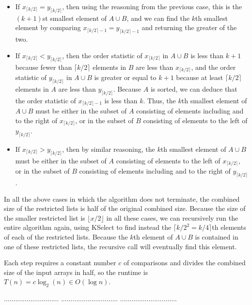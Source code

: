 \documentclass[a4paper,11pt]{article}
\begin{document}
\begin{itemize}
    \item
        If $x_{\lceil k/2 \rceil} = y_{\lceil k/2 \rceil}$, then using the reasoning from the previous case, this is the $(k + 1)$st smallest element of $A \cup B$, and we can find the $k$th smallest element by comparing $x_{\lceil k/2 \rceil - 1} = y_{\lceil k/2 \rceil - 1}$ and returning the greater of the two.
    \item
        If $x_{\lceil k/2 \rceil} < y_{\lceil k/2 \rceil}$, then the order statistic of $x_{\lceil k/2 \rceil}$ in $A \cup B$ is less than $k + 1$ because fewer than $\lceil k/2 \rceil$ elements in $B$ are less than $x_{\lceil k/2 \rceil}$, and the order statistic of $y_{\lceil k/2 \rceil}$ in $A \cup B$ is greater or equal to $k + 1$ because at least $\lceil k/2 \rceil$ elements in $A$ are less than $y_{\lceil k/2 \rceil}$. Because $A$ is sorted, we can deduce that the order statistic of $x_{\lceil k/2 \rceil - 1}$ is less than $k$. Thus, the $k$th smallest element of $A \cup B$ must be either in the subset of $A$ consisting of elements including and to the right of $x_{\lceil k/2 \rceil}$, or in the subset of $B$ consisting of elements to the left of $y_{\lceil k/2 \rceil}$.
    \item
        If $x_{\lceil k/2 \rceil} > y_{\lceil k/2 \rceil}$, then by similar reasoning, the $k$th smallest element of $A \cup B$ must be either in the subset of $A$ consisting of elements to the left of $x_{\lceil k/2 \rceil}$, or in the subset of $B$ consisting of elements including and to the right of $y_{\lceil k/2 \rceil}$.
\end{itemize}
In all the above cases in which the algorithm does not terminate, the combined size of the restricted lists is half of the original combined size. Because the size of the smaller restricted list is $\lfloor x/2 \rfloor$ in all these cases, we can recursively run the entire algorithm again, using KSelect to find instead the $\lceil k/2^2 = k/4 \rceil$th elements of each of the restricted lists. Because the $k$th element of $A \cup B$ is contained in one of these restricted lists, the recursive call will eventually find this element. \par
Each step requires a constant number $c$ of comparisons and divides the combined size of the input arrays in half, so the runtime is $T(n) = c \log_2(n) \in O(\log n)$.

\pagebreak
{} $.............................$
 $..............................$
          $..............................$\\
\end{document}
